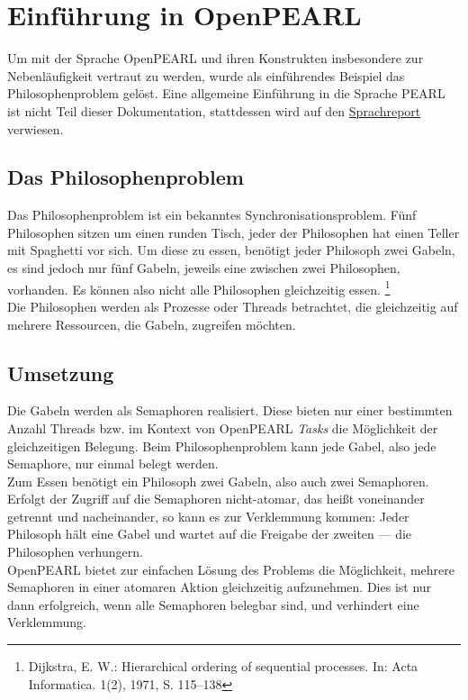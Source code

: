 \chapter{Einführung in OpenPEARL}

Um mit der Sprache OpenPEARL und ihren Konstrukten insbesondere zur Nebenläufigkeit vertraut zu werden, wurde als einführendes Beispiel das Philosophenproblem gelöst. Eine allgemeine Einführung in die Sprache PEARL ist nicht Teil dieser Dokumentation, stattdessen wird auf den
\href{http://www.real-time.de/misc/PEARL90-Sprachreport-V2.0-GI-1995-de.pdf}{Sprachreport} verwiesen.

\section{Das Philosophenproblem}
	Das Philosophenproblem ist ein bekanntes Synchronisationsproblem. Fünf Philosophen sitzen um einen runden Tisch, jeder der Philosophen hat einen Teller mit Spaghetti vor sich. Um diese zu essen, benötigt jeder Philosoph zwei Gabeln, es sind jedoch nur fünf Gabeln, jeweils eine zwischen zwei Philosophen, vorhanden. Es können also nicht alle Philosophen gleichzeitig essen. \footnote{Dijkstra, E. W.: Hierarchical ordering of sequential processes. In: Acta Informatica. 1(2), 1971, S. 115–138}\\
	Die Philosophen werden als Prozesse oder Threads betrachtet, die gleichzeitig auf mehrere Ressourcen, die Gabeln, zugreifen möchten.
	
\section{Umsetzung}
	Die Gabeln werden als Semaphoren realisiert. Diese bieten nur einer bestimmten Anzahl Threads bzw. im Kontext von OpenPEARL \emph{Tasks} die Möglichkeit der gleichzeitigen Belegung. Beim Philosophenproblem kann jede Gabel, also jede Semaphore, nur einmal belegt werden.\\
	Zum Essen benötigt ein Philosoph zwei Gabeln, also auch zwei Semaphoren. Erfolgt der Zugriff auf die Semaphoren nicht-atomar, das heißt voneinander getrennt und nacheinander, so kann es zur Verklemmung kommen: Jeder Philosoph hält eine Gabel und wartet auf die Freigabe der zweiten --- die Philosophen verhungern.\\
	OpenPEARL bietet zur einfachen Lösung des Problems die Möglichkeit, mehrere Semaphoren in einer atomaren Aktion gleichzeitig aufzunehmen. Dies ist nur dann erfolgreich, wenn alle Semaphoren belegbar sind, und verhindert eine Verklemmung.

